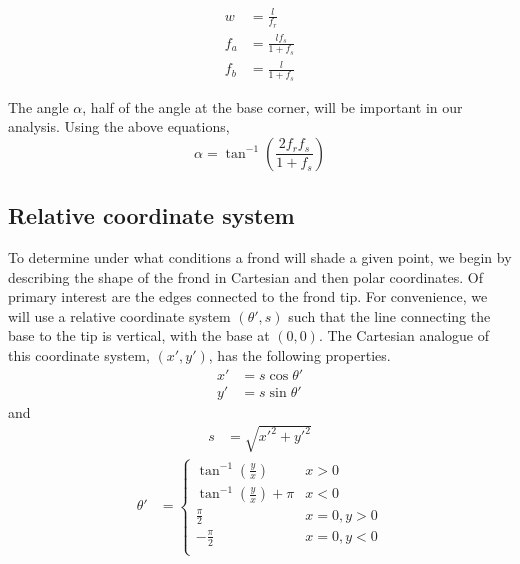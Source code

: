 \documentclass[10pt]{article}
\begin{document}
\begin{multicols}{2}
\begin{align}
	w &= \frac{l}{f_r} \\
	f_a &= \frac{lf_s}{1+f_s} \\
	f_b &= \frac{l}{1+f_s}
\end{align}

The angle $\alpha$, half of the angle at the base corner, will be important in our analysis.
Using the above equations,
\begin{equation}
	\alpha = \tan^{-1}\left(\frac{2f_rf_s}{1+f_s}\right)
\end{equation}

\subsection{Relative coordinate system}
\label{sec:rel_coords}
To determine under what conditions a frond will shade a given point, we begin by describing the shape of the frond in Cartesian and then polar coordinates.
Of primary interest are the edges connected to the frond tip.
For convenience, we will use a relative coordinate system $(\theta',s)$ such that the line connecting the base to the tip is vertical, with the base at $(0,0)$.
The Cartesian analogue of this coordinate system, $(x',y')$, has the following properties.
\begin{align}
	x' &= s\cos\theta' \\ 
	y' &= s\sin\theta'
\end{align}
and
\begin{align}
	s &= \sqrt{x'^2+y'^2}
\end{align}
\vspace{-1em}
\begin{align}
	\theta' &= 
	\begin{cases}
		\tan^{-1}\left( \frac{y}{x} \right) & x > 0 \\
		\tan^{-1}\left( \frac{y}{x} \right) + \pi & x < 0 \\
		\frac{\pi}{2} & x = 0, y > 0 \\
		-\frac{\pi}{2} & x = 0, y < 0 \\
	\end{cases}
\end{align}



\end{multicols}
\end{document}
